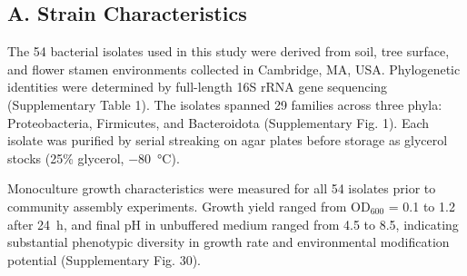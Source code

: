 \subsection*{A. Strain Characteristics}
\label{sec:suppl:materials}

The 54 bacterial isolates used in this study were derived from soil, tree surface, and flower stamen environments collected in Cambridge, MA, USA. Phylogenetic identities were determined by full-length 16S rRNA gene sequencing (Supplementary Table 1). The isolates spanned 29 families across three phyla: Proteobacteria, Firmicutes, and Bacteroidota (Supplementary Fig. 1). Each isolate was purified by serial streaking on agar plates before storage as glycerol stocks (25\% glycerol, $-80$~°C).

Monoculture growth characteristics were measured for all 54 isolates prior to community assembly experiments. Growth yield ranged from OD$_{600}$ = 0.1 to 1.2 after 24~h, and final pH in unbuffered medium ranged from 4.5 to 8.5, indicating substantial phenotypic diversity in growth rate and environmental modification potential (Supplementary Fig. 30).

